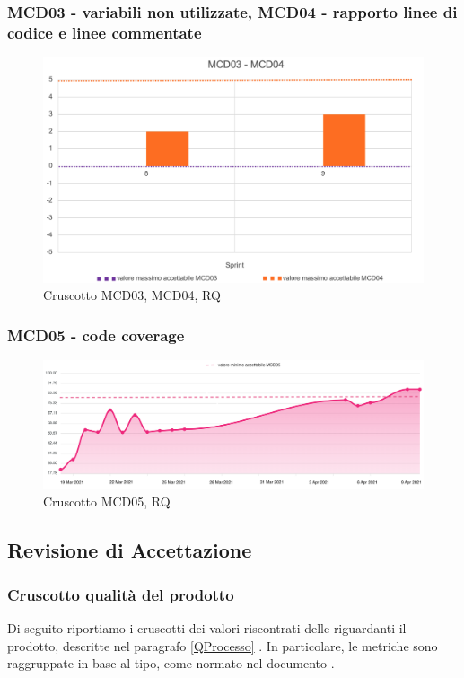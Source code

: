 \subsubsection*{MCD03 - variabili non utilizzate, MCD04 - rapporto linee di codice e linee commentate}
\begin{figure}[H] 
    \centering
    \includegraphics[scale = 0.6]{immagini/MCD03-04.png}
    \caption{Cruscotto MCD03, MCD04, RQ}
\end{figure}

\subsubsection*{MCD05 - code coverage}
\begin{figure}[H] 
    \centering
    \includegraphics[scale = 0.4]{immagini/MCD05.png}
    \caption{Cruscotto MCD05, RQ}
\end{figure}

\newpage

\subsection{Revisione di Accettazione}
\subsubsection{Cruscotto qualità del prodotto}
Di seguito riportiamo i cruscotti dei valori riscontrati delle  riguardanti il prodotto, descritte nel paragrafo \ref{QProcesso} .  In particolare, le metriche sono raggruppate in base al tipo, come normato nel documento \NdP{}.
